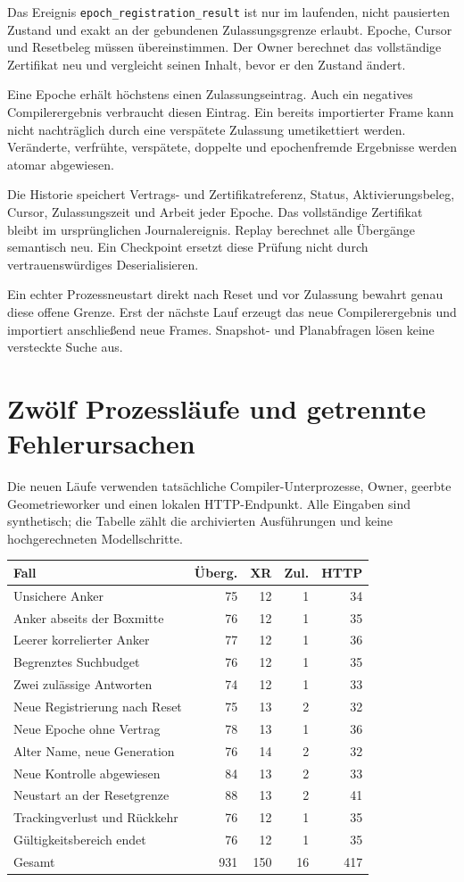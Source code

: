 \documentclass[11pt,a4paper]{article}
\newcommand{\nextsection}[2]{\clearpage{\color{accent}\small\textsf{#1}}\section{#2}}
\begin{document}
Das Ereignis \texttt{epoch\_registration\_result} ist nur im
laufenden, nicht pausierten Zustand und exakt an der gebundenen
Zulassungsgrenze erlaubt. Epoche, Cursor und Resetbeleg müssen
übereinstimmen. Der Owner berechnet das vollständige Zertifikat
neu und vergleicht seinen Inhalt, bevor er den Zustand ändert.

Eine Epoche erhält höchstens einen Zulassungseintrag. Auch ein
negatives Compilerergebnis verbraucht diesen Eintrag. Ein bereits
importierter Frame kann nicht nachträglich durch eine verspätete
Zulassung umetikettiert werden. Veränderte, verfrühte, verspätete,
doppelte und epochenfremde Ergebnisse werden atomar abgewiesen.

Die Historie speichert Vertrags- und Zertifikatreferenz, Status,
Aktivierungsbeleg, Cursor, Zulassungszeit und Arbeit jeder Epoche.
Das vollständige Zertifikat bleibt im ursprünglichen Journalereignis.
Replay berechnet alle Übergänge semantisch neu. Ein Checkpoint
ersetzt diese Prüfung nicht durch vertrauenswürdiges Deserialisieren.

Ein echter Prozessneustart direkt nach Reset und vor Zulassung
bewahrt genau diese offene Grenze. Erst der nächste Lauf erzeugt
das neue Compilerergebnis und importiert anschließend neue Frames.
Snapshot- und Planabfragen lösen keine versteckte Suche aus.

\nextsection{111 / AUSGEFÜHRTE GEGENVERSUCHE}{Zwölf Prozessläufe und getrennte Fehlerursachen}
Die neuen Läufe verwenden tatsächliche Compiler-Unterprozesse,
Owner, geerbte Geometrieworker und einen lokalen HTTP-Endpunkt.
Alle Eingaben sind synthetisch; die Tabelle zählt die archivierten
Ausführungen und keine hochgerechneten Modellschritte.

\begin{tabularx}{\linewidth}{@{}Yrrrr@{}}\toprule
Fall & Überg. & XR & Zul. & HTTP\\\midrule
Unsichere Anker & 75 & 12 & 1 & 34\\
Anker abseits der Boxmitte & 76 & 12 & 1 & 35\\
Leerer korrelierter Anker & 77 & 12 & 1 & 36\\
Begrenztes Suchbudget & 76 & 12 & 1 & 35\\
Zwei zulässige Antworten & 74 & 12 & 1 & 33\\
Neue Registrierung nach Reset & 75 & 13 & 2 & 32\\
Neue Epoche ohne Vertrag & 78 & 13 & 1 & 36\\
Alter Name, neue Generation & 76 & 14 & 2 & 32\\
Neue Kontrolle abgewiesen & 84 & 13 & 2 & 33\\
Neustart an der Resetgrenze & 88 & 13 & 2 & 41\\
Trackingverlust und Rückkehr & 76 & 12 & 1 & 35\\
Gültigkeitsbereich endet & 76 & 12 & 1 & 35\\
\midrule
Gesamt & 931 & 150 & 16 & 417\\\bottomrule
\end{tabularx}
\end{document}
